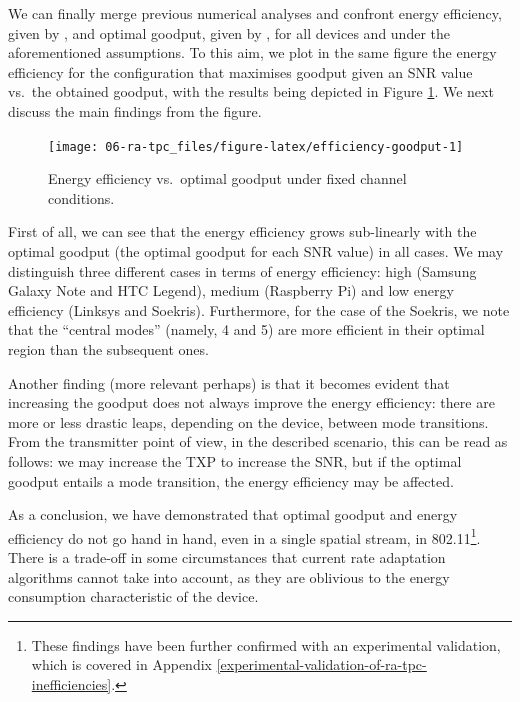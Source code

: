 \documentclass[twoside,nohyper]{tufte-book}
\makeatletter
\let\orig@maketag@@@\maketag@@@
\renewcommand{\eqref}[1]{\textup{\let\maketag@@@\orig@maketag@@@\tagform@{\ref{#1}}}}
\def\maketag@@@#1{\hbox{\rlap{\kern\marginparsep\m@th\normalfont#1}\kern1sp}}
\theoremstyle{definition}
\theoremstyle{definition}
\theoremstyle{definition}
\theoremstyle{remark}
\makeatother
\begin{document}
We can finally merge previous numerical analyses and confront energy
efficiency, given by \eqref{eq:efficiency}, and optimal goodput, given by
\eqref{eq:maxgoodput}, for all devices and under the aforementioned
assumptions. To this aim, we plot in the same figure the energy
efficiency for the configuration that maximises goodput given an SNR
value vs.~the obtained goodput, with the results being depicted in
Figure \ref{fig:efficiency-goodput}. We next discuss the main findings
from the figure.




\begin{figure}

{\centering \texttt{[image: 06-ra-tpc\_files/figure-latex/efficiency-goodput-1]} 

}

\caption[Energy efficiency vs.~optimal goodput under
fixed channel conditions.]{Energy efficiency vs.~optimal goodput under
fixed channel conditions.}\label{fig:efficiency-goodput}
\end{figure}

First of all, we can see that the energy efficiency grows sub-linearly
with the optimal goodput (the optimal goodput for each SNR value) in all
cases. We may distinguish three different cases in terms of energy
efficiency: high (Samsung Galaxy Note and HTC Legend), medium (Raspberry
Pi) and low energy efficiency (Linksys and Soekris). Furthermore, for
the case of the Soekris, we note that the ``central modes'' (namely, 4
and 5) are more efficient in their optimal region than the subsequent
ones.

Another finding (more relevant perhaps) is that it becomes evident that
increasing the goodput does not always improve the energy efficiency:
there are more or less drastic leaps, depending on the device, between
mode transitions. From the transmitter point of view, in the described
scenario, this can be read as follows: we may increase the TXP to
increase the SNR, but if the optimal goodput entails a mode transition,
the energy efficiency may be affected.

As a conclusion, we have demonstrated that optimal goodput and energy
efficiency do not go hand in hand, even in a single spatial stream, in
802.11\footnote{These findings have been further confirmed with an
  experimental validation, which is covered in Appendix
  \ref{experimental-validation-of-ra-tpc-inefficiencies}.}. There is a
trade-off in some circumstances that current rate adaptation algorithms
cannot take into account, as they are oblivious to the energy
consumption characteristic of the device.
\end{document}
